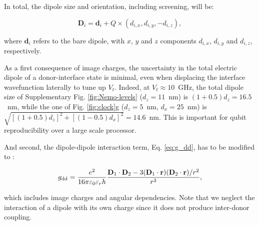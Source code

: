 \documentclass[aps,prb,superscriptaddress,nobibnotes,twocolumn]{revtex4-1}
\begin{document}
In total, the dipole size and orientation, including screening, will be:

\begin{equation} \label{eq:D_ic}
\textbf{D}_i=\textbf{d}_i+Q\times(d_{i,x},d_{i,y},-d_{i,z}),
\end{equation}

where $\textbf{d}_i$ refers to the bare dipole, with $x$, $y$ and $z$ components $d_{i,x}$, $d_{i,y}$ and $d_{i,z}$, respectively.

As a first consequence of image charges, the uncertainty in the total electric dipole of a donor-interface state is minimal, even when displacing the interface wavefunction laterally to tune up $V_t$. Indeed, at $V_t\approx10$~GHz, the total dipole size of Supplementary Fig. \ref{fig:Nemo-levels} ($d_z=11$~nm) is $(1+0.5)d_z=16.5$~nm, while the one of Fig. \ref{fig:clock}g ($d_z=5$~nm, $d_x=25$~nm) is $\sqrt{[(1+0.5)d_z]^2+[(1-0.5)d_x]^2}=14.6$~nm. This is important for qubit reproducibility over a large scale processor.

And second, the dipole-dipole interaction term, Eq. \ref{eq:g_dd}, has to be modified to \cite{Ravets2014S}:

\begin{equation} \label{eq:g_dd_ic}
g_{\rm dd}=\frac{e^2}{16\pi\varepsilon_0\varepsilon_r h}\frac{\textbf{D}_1\cdot\textbf{D}_2-3(\textbf{D}_1\cdot\textbf{r})(\textbf{D}_2\cdot\textbf{r})/r^2}{r^3},
\end{equation}

which includes image charges and angular dependencies. Note that we neglect the interaction of a dipole with its own charge since it does not produce inter-donor coupling.
\end{document}
